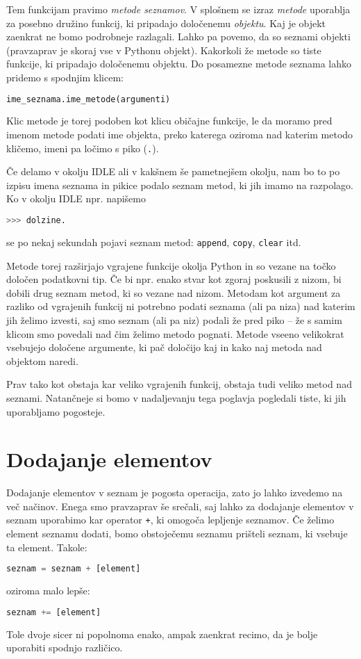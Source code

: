 Tem funkcijam pravimo \emph{metode seznamov}. V splošnem se izraz \emph{metode} uporablja za posebno družino funkcij, ki pripadajo določenemu \emph{objektu}. Kaj je objekt zaenkrat ne bomo podrobneje razlagali. Lahko pa povemo, da so seznami objekti (pravzaprav je skoraj vse v Pythonu objekt). Kakorkoli že metode so tiste funkcije, ki pripadajo določenemu objektu. Do posamezne metode seznama lahko pridemo s spodnjim klicem:
\begin{lstlisting}[language=Python]
ime_seznama.ime_metode(argumenti)
\end{lstlisting}
Klic metode je torej podoben kot klicu običajne funkcije, le da moramo pred imenom metode podati ime objekta, preko katerega oziroma nad katerim metodo kličemo, imeni pa ločimo s piko (\texttt{.}).

Če delamo v okolju IDLE ali v kakšnem še pametnejšem okolju, nam bo to po izpisu imena seznama in pikice podalo seznam metod, ki jih imamo na razpolago. Ko v okolju IDLE npr. napišemo
\begin{lstlisting}[language=Python]
>>> dolzine.
\end{lstlisting}
se po nekaj sekundah pojavi seznam metod: \texttt{append}, \texttt{copy}, \texttt{clear} itd.

Metode torej razširjajo vgrajene funkcije okolja Python in so vezane na točko določen podatkovni tip. Če bi npr. enako stvar kot zgoraj poskusili z nizom, bi dobili drug seznam metod, ki so vezane nad nizom. Metodam kot argument za razliko od vgrajenih funkcij ni potrebno podati seznama (ali pa niza) nad katerim jih želimo izvesti, saj smo seznam (ali pa niz) podali že pred piko -- že s samim klicom smo povedali nad čim želimo metodo pognati. Metode vseeno velikokrat vsebujejo določene argumente, ki pač določijo kaj in kako naj metoda nad objektom naredi. 

Prav tako kot obstaja kar veliko vgrajenih funkcij, obstaja tudi veliko metod nad seznami. Natančneje si bomo v nadaljevanju tega poglavja pogledali tiste, ki jih uporabljamo pogosteje.

\section{Dodajanje elementov}

Dodajanje elementov v seznam je pogosta operacija, zato jo lahko izvedemo na več načinov. Enega smo pravzaprav še srečali, saj lahko za dodajanje elementov v seznam uporabimo kar operator \texttt{+}, ki omogoča lepljenje seznamov. Če želimo element seznamu dodati, bomo obstoječemu seznamu prišteli seznam, ki vsebuje ta element. Takole:
\begin{lstlisting}[language=Python]
seznam = seznam + [element]
\end{lstlisting}
oziroma malo lepše:
\begin{lstlisting}[language=Python]
seznam += [element]
\end{lstlisting}
Tole dvoje sicer ni popolnoma enako, ampak zaenkrat recimo, da je bolje uporabiti spodnjo različico. 

